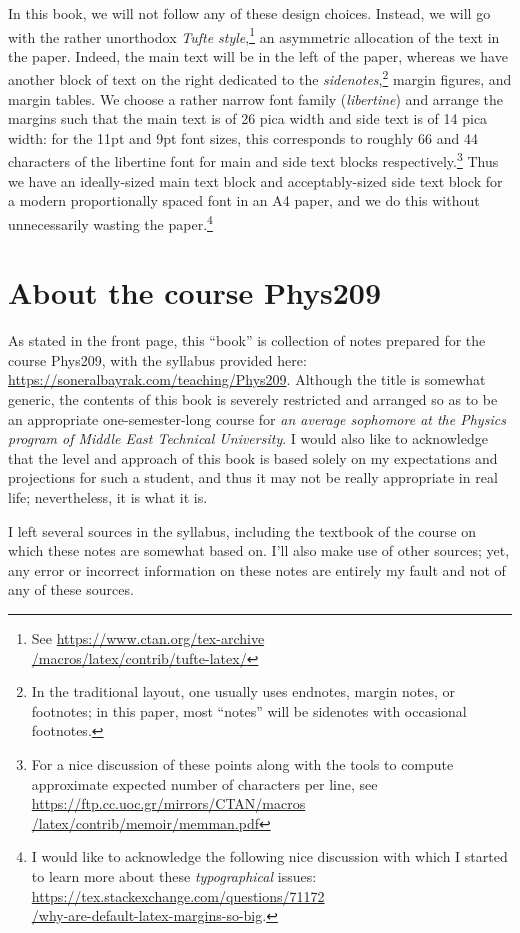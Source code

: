 \hphantom{\indent} In this book, we will not follow any of these design choices. Instead, we will go with the rather unorthodox \emph{Tufte style},\footnote{See \href{https://www.ctan.org/tex-archive/macros/latex/contrib/tufte-latex/}{https://www.ctan.org/tex-archive\\/macros/latex/contrib/tufte-latex/}} an asymmetric allocation of the text in the paper. Indeed, the main text will be in the left of the paper, whereas we have another block of text on the right dedicated to the \emph{sidenotes},\footnote{In the traditional layout, one usually uses endnotes, margin notes, or footnotes; in this paper, most ``notes'' will be sidenotes with occasional footnotes.\bottomnotemark} margin figures, and margin tables. We choose a rather narrow font family (\emph{libertine}) and arrange the margins such that the main text is of 26 pica width and side text is of 14 pica width: for the 11pt and 9pt font sizes, this corresponds to roughly 66 and 44 characters of the libertine font for main and side text blocks respectively.\footnote{For a nice discussion of these points along with the tools to compute approximate expected number of characters per line, see \href{https://ftp.cc.uoc.gr/mirrors/CTAN/macros/latex/contrib/memoir/memman.pdf}{https://ftp.cc.uoc.gr/mirrors/CTAN/macros\\/latex/contrib/memoir/memman.pdf}} Thus we have an ideally-sized main text block and acceptably-sized side text block for a modern proportionally spaced font in an A4 paper, and we do this without unnecessarily wasting the paper.\footnote{I would like to acknowledge the following nice discussion with which I started to learn more about these \emph{typographical} issues: \href{https://tex.stackexchange.com/questions/71172/why-are-default-latex-margins-so-big}{https://tex.stackexchange.com/questions/71172\\/why-are-default-latex-margins-so-big}.}

\section{About the course Phys209}
As stated in the front page, this ``book'' is collection of notes prepared for the course Phys209, with the syllabus provided here:\\ \hyperref{https://soneralbayrak.com/teaching/Phys209}{}{}{https://soneralbayrak.com/teaching/Phys209}. Although the title is somewhat generic, the contents of this book is severely restricted and arranged so as to be an appropriate one-semester-long course for \emph{an average sophomore at the Physics program of Middle East Technical University}. I would also like to acknowledge that the level and approach of this book is based solely on my expectations and projections for such a student, and thus it may not be really appropriate in real life; nevertheless, it is what it is.

I left several sources in the syllabus, including the textbook of the course on which these notes are somewhat based on. I'll also make use of other sources; yet, any error or incorrect information on these notes are entirely my fault and not of any of these sources.